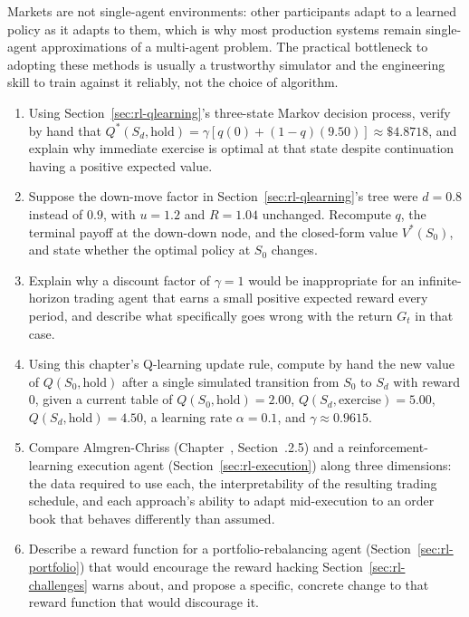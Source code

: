 \documentclass[../ai_in_finance]{subfiles}
\begin{document}
Markets are not single-agent environments: other participants adapt to a learned policy as it adapts to them, which is why most production systems remain single-agent approximations of a multi-agent problem. The practical bottleneck to adopting these methods is usually a trustworthy simulator and the engineering skill to train against it reliably, not the choice of algorithm.


\begin{enumerate}[exercises]
    \item Using Section~\ref{sec:rl-qlearning}'s three-state Markov decision process, verify by hand that $Q^*(S_d, \text{hold}) = \gamma[q(0) + (1-q)(9.50)] \approx \$4.8718$, and explain why immediate exercise is optimal at that state despite continuation having a positive expected value.
    \item Suppose the down-move factor in Section~\ref{sec:rl-qlearning}'s tree were $d=0.8$ instead of $0.9$, with $u=1.2$ and $R=1.04$ unchanged. Recompute $q$, the terminal payoff at the down-down node, and the closed-form value $V^*(S_0)$, and state whether the optimal policy at $S_0$ changes.
    \item Explain why a discount factor of $\gamma=1$ would be inappropriate for an infinite-horizon trading agent that earns a small positive expected reward every period, and describe what specifically goes wrong with the return $G_t$ in that case.
    \item Using this chapter's Q-learning update rule, compute by hand the new value of $Q(S_0,\text{hold})$ after a single simulated transition from $S_0$ to $S_d$ with reward $0$, given a current table of $Q(S_0,\text{hold})=2.00$, $Q(S_d,\text{exercise})=5.00$, $Q(S_d,\text{hold})=4.50$, a learning rate $\alpha=0.1$, and $\gamma\approx0.9615$.
    \item Compare Almgren-Chriss (Chapter~, Section~.2.5) and a reinforcement-learning execution agent (Section~\ref{sec:rl-execution}) along three dimensions: the data required to use each, the interpretability of the resulting trading schedule, and each approach's ability to adapt mid-execution to an order book that behaves differently than assumed.
    \item Describe a reward function for a portfolio-rebalancing agent (Section~\ref{sec:rl-portfolio}) that would encourage the reward hacking Section~\ref{sec:rl-challenges} warns about, and propose a specific, concrete change to that reward function that would discourage it.

\end{enumerate}
\end{document}
